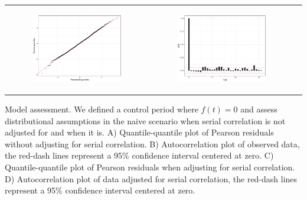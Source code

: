 \documentclass[11pt]{article}
\begin{document}
\begin{suppfigure}[ht]
\begin{tabular}{lll}
\begin{subfigure}[t]{0.49\linewidth}
		\centering
		\includegraphics[width=1\linewidth]{figs/supp-figure-2c.pdf}
	\end{subfigure}&
	\begin{subfigure}[t]{0.49\linewidth}
    	\centering
	    \includegraphics[width=1\linewidth]{figs/supp-figure-2d.pdf}
    \end{subfigure}\\
    \end{tabular}
    \caption{Model assessment. We defined a control period where $f(t)=0$ and assess distributional assumptions in the naive scenario when serial correlation is not adjusted for and when it is. A) Quantile-quantile plot of Pearson residuals without adjusting for serial correlation. B) Autocorrelation plot of observed data, the red-dash lines represent a 95\% confidence interval centered at zero. C) Quantile-quantile plot of Pearson residuals when adjusting for serial correlation. D) Autocorrelation plot of data adjusted for serial correlation, the red-dash lines represent a 95\% confidence interval centered at zero.}
    \label{supp-fig:correlated-errors}
\end{suppfigure}
\end{document}
